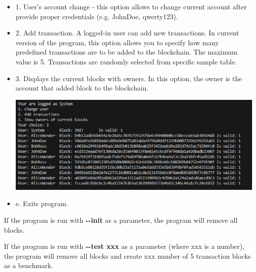 \documentclass{article}
\begin{document}
\begin{itemize}
    \item 1. User's account change - this option allows to change current account after provide proper credentials (e.g. JohnDoe, qwerty123). 
    \item 2. Add transaction. A logged-in user can add new transactions. In current version of the program, this option allows you to specify how many predefined transactions are to be added to the blockchain. The maximum value is 5. Transactions are randomly selected from specific sample table.
    \item 3. Displays the current blocks with owners. In this option, the owner is the account that added block to the blockchain.
    
    \includegraphics[width=\textwidth]{block_list.png}
    \item e. Exits program.
\end{itemize}

If the program is run with \textbf{{-}{-}init} as a parameter, the program will remove all blocks.

If the program is run with \textbf{{-}{-}test xxx} as a parameter (where xxx is a number), the program will remove all blocks and create xxx number of 5 transaction blocks as a benchmark.
\end{document}
